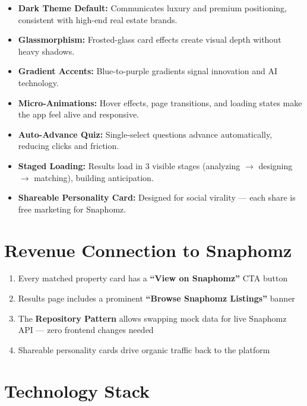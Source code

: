 \documentclass[11pt,a4paper]{article}
\begin{document}
\begin{itemize}[nosep]
    \item \textbf{Dark Theme Default:} Communicates luxury and premium positioning, consistent with high-end real estate brands.
    \item \textbf{Glassmorphism:} Frosted-glass card effects create visual depth without heavy shadows.
    \item \textbf{Gradient Accents:} Blue-to-purple gradients signal innovation and AI technology.
    \item \textbf{Micro-Animations:} Hover effects, page transitions, and loading states make the app feel alive and responsive.
    \item \textbf{Auto-Advance Quiz:} Single-select questions advance automatically, reducing clicks and friction.
    \item \textbf{Staged Loading:} Results load in 3 visible stages (analyzing $\rightarrow$ designing $\rightarrow$ matching), building anticipation.
    \item \textbf{Shareable Personality Card:} Designed for social virality --- each share is free marketing for Snaphomz.
\end{itemize}

\section{Revenue Connection to Snaphomz}

\begin{enumerate}[nosep]
    \item Every matched property card has a \textbf{``View on Snaphomz''} CTA button
    \item Results page includes a prominent \textbf{``Browse Snaphomz Listings''} banner
    \item The \textbf{Repository Pattern} allows swapping mock data for live Snaphomz API --- zero frontend changes needed
    \item Shareable personality cards drive organic traffic back to the platform
\end{enumerate}

\section{Technology Stack}
\end{document}

